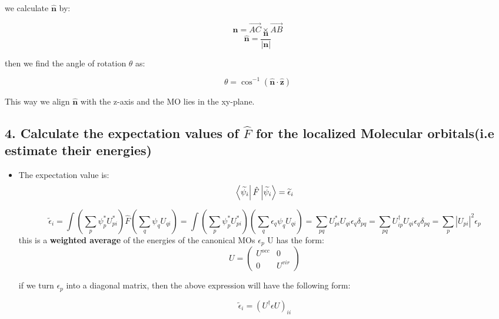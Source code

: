 \documentclass{article}
\begin{document}
\begin{itemize}
\begin{center}
\begin{tikzpicture}[tdplot_main_coords, scale=1.2]
\end{tikzpicture}
\end{center}

we calculate $\mathbf{\hat{n}}$ by:

\[
\mathbf{n} = \vec{AC} \times \vec{AB}
\]
\[
\mathbf{\hat{n}} = \frac{\mathbf{n}}{|{\mathbf{n}}|}
\]

then we find the angle of rotation $\theta$ as:

\[
\theta = \cos^{-1}\left({ \mathbf{\hat{n}} \cdot \hat{\mathbf{z}} }\right)
\]

This way we align $\mathbf{\hat{n}}$ with the z-axis and the MO lies in the xy-plane.

\end{itemize}

\subsection*{4. Calculate the expectation values of \(\hat{F}\) for the localized Molecular orbitals(i.e estimate their energies)}

\begin{itemize}
    \item The expectation value is: 
    \[
    \bra{\widetilde{\psi}_i}\hat{F}\ket{\widetilde{\psi}_i} = \widetilde{\epsilon}_i
    \]

    \[
    \widetilde{\epsilon}_i = \int (\sum_{p} \psi_{p}^{*} U_{pi}^{*}) \hat{F}(\sum_{q} \psi_{q} U_{qi}) =
    \int (\sum_{p} \psi_{p}^{*} U_{pi}^{*})(\sum_{q} \epsilon_q \psi_{q} U_{qi}) =
    \sum_{pq} U_{pi}^{*}U_{qi}\epsilon_{q}\delta_{pq} = \sum_{pq} U_{ip}^{\dagger}U_{qi}\epsilon_{q}\delta_{pq} = \sum_{p} |U_{pi}|^{2}\epsilon_{p}
    \]
    this is a \textbf{weighted average} of the energies of the canonical MOs $\epsilon_p$
    U has the form:
    \[ U =  
    \begin{pmatrix}
    U^{occ} & 0 \\
    0 & U^{vir}
    \end{pmatrix}   
    \]

    if we turn $\epsilon_p$ into a diagonal matrix, then the above expression will have the following form:

    \[
    \widetilde{\epsilon}_i = (U^{\dagger}\epsilon U)_{ii}
    \]

\end{itemize}
\end{document}
